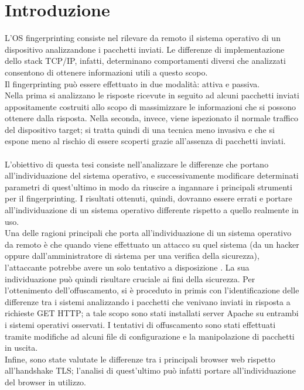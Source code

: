 

\chapter{Introduzione}
\label{introduzione}

L'OS fingerprinting consiste nel rilevare da remoto il sistema operativo di un dispositivo analizzandone i pacchetti inviati. Le differenze di implementazione dello stack TCP/IP, infatti, determinano comportamenti diversi che analizzati consentono di ottenere informazioni utili a questo scopo. \\
Il fingerprinting può essere effettuato in due modalità: attiva e passiva. \\ 
Nella prima si analizzano le risposte ricevute in seguito ad alcuni pacchetti inviati appositamente costruiti allo scopo di massimizzare le informazioni che si possono ottenere dalla risposta.
Nella seconda, invece, viene ispezionato il normale traffico del dispositivo target; si tratta quindi di una tecnica meno invasiva e che si espone meno al rischio di essere scoperti grazie all'assenza di pacchetti inviati.
\\
\\
L'obiettivo di questa tesi consiste nell'analizzare le differenze che portano all'individuazione del sistema operativo, e successivamente modificare determinati parametri di quest'ultimo in modo da riuscire a ingannare i principali strumenti per il fingerprinting.
I risultati ottenuti, quindi, dovranno essere errati e portare all'individuazione di un sistema operativo differente rispetto a quello realmente in uso.\\
Una delle ragioni principali che porta all'individuazione di un sistema operativo da remoto è che quando viene effettuato un attacco su quel sistema (da un hacker oppure dall'amministratore di sistema per una verifica della sicurezza), l'attaccante potrebbe avere un solo tentativo a disposizione \cite{ragioni}. La sua individuazione può quindi risultare cruciale ai fini della sicurezza.
Per l'ottenimento dell'offuscamento, si è proceduto in primis con l'identificazione delle differenze tra i sistemi analizzando i pacchetti che venivano inviati in risposta a richieste GET HTTP; a tale scopo sono stati installati server Apache su entrambi i sistemi operativi osservati. I tentativi di offuscamento sono stati effettuati tramite modifiche ad alcuni file di configurazione e la manipolazione di pacchetti in uscita.
\\
Infine, sono state valutate le differenze tra i principali browser web rispetto all'handshake TLS; l'analisi di quest'ultimo può infatti portare all'individuazione del browser in utilizzo.










